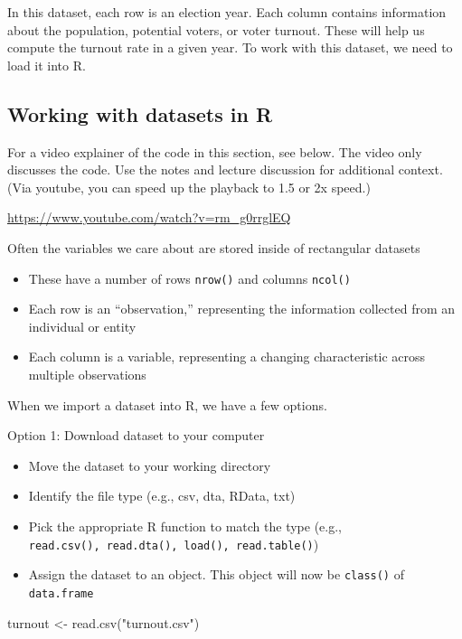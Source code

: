 \documentclass[
  letterpaper,
  DIV=11,
  numbers=noendperiod]{scrreprt}
\newenvironment{Shaded}{\begin{snugshade}}{\end{snugshade}}
\newcommand{\FunctionTok}[1]{\textcolor[rgb]{0.28,0.35,0.67}{#1}}
\newcommand{\NormalTok}[1]{\textcolor[rgb]{0.00,0.23,0.31}{#1}}
\newcommand{\OtherTok}[1]{\textcolor[rgb]{0.00,0.23,0.31}{#1}}
\newcommand{\StringTok}[1]{\textcolor[rgb]{0.13,0.47,0.30}{#1}}
\providecommand{\tightlist}{%
  \setlength{\itemsep}{0pt}\setlength{\parskip}{0pt}}\usepackage{longtable,booktabs,array}
\begin{document}
In this dataset, each row is an election year. Each column contains
information about the population, potential voters, or voter turnout.
These will help us compute the turnout rate in a given year. To work
with this dataset, we need to load it into R.

\hypertarget{working-with-datasets-in-r}{%
\subsection{Working with datasets in
R}\label{working-with-datasets-in-r}}

For a video explainer of the code in this section, see below. The video
only discusses the code. Use the notes and lecture discussion for
additional context. (Via youtube, you can speed up the playback to 1.5
or 2x speed.)

\url{https://www.youtube.com/watch?v=rm_g0rrglEQ}

Often the variables we care about are stored inside of rectangular
datasets

\begin{itemize}
\tightlist
\item
  These have a number of rows \texttt{nrow()} and columns
  \texttt{ncol()}
\item
  Each row is an ``observation,'' representing the information collected
  from an individual or entity
\item
  Each column is a variable, representing a changing characteristic
  across multiple observations
\end{itemize}

When we import a dataset into R, we have a few options.

Option 1: Download dataset to your computer

\begin{itemize}
\tightlist
\item
  Move the dataset to your working directory
\item
  Identify the file type (e.g., csv, dta, RData, txt)
\item
  Pick the appropriate R function to match the type (e.g.,
  \texttt{read.csv(),\ read.dta(),\ load(),\ read.table()})
\item
  Assign the dataset to an object. This object will now be
  \texttt{class()} of \texttt{data.frame}
\end{itemize}

\begin{Shaded}
\begin{Highlighting}[]
\NormalTok{turnout }\OtherTok{\textless{}{-}} \FunctionTok{read.csv}\NormalTok{(}\StringTok{"turnout.csv"}\NormalTok{)}
\end{Highlighting}
\end{Shaded}
\end{document}
